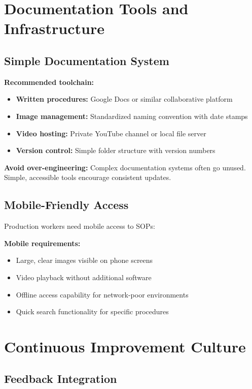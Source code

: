 \section{Documentation Tools and Infrastructure}

\subsection{Simple Documentation System}

\textbf{Recommended toolchain:}
\begin{itemize}
\item \textbf{Written procedures:} Google Docs or similar collaborative platform
\item \textbf{Image management:} Standardized naming convention with date stamps
\item \textbf{Video hosting:} Private YouTube channel or local file server
\item \textbf{Version control:} Simple folder structure with version numbers
\end{itemize}

\textbf{Avoid over-engineering:} Complex documentation systems often go unused. Simple, accessible tools encourage consistent updates.

\subsection{Mobile-Friendly Access}

Production workers need mobile access to SOPs:

\textbf{Mobile requirements:}
\begin{itemize}
\item Large, clear images visible on phone screens
\item Video playback without additional software
\item Offline access capability for network-poor environments
\item Quick search functionality for specific procedures
\end{itemize}

\section{Continuous Improvement Culture}

\subsection{Feedback Integration}

